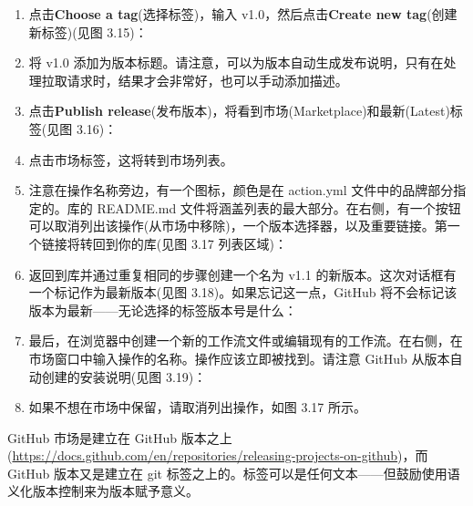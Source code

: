 \begin{enumerate}
\item 
点击\textbf{Choose a tag}(选择标签)，输入 v1.0，然后点击\textbf{Create new tag}(创建新标签)(见图 3.15)：


\item 
将 v1.0 添加为版本标题。请注意，可以为版本自动生成发布说明，只有在处理拉取请求时，结果才会非常好，也可以手动添加描述。

\item 
点击\textbf{Publish release}(发布版本)，将看到市场(Marketplace)和最新(Latest)标签(见图 3.16)：


\item 
点击市场标签，这将转到市场列表。

\item 
注意在操作名称旁边，有一个图标，颜色是在 action.yml 文件中的品牌部分指定的。库的 README.md 文件将涵盖列表的最大部分。在右侧，有一个按钮可以取消列出该操作(从市场中移除)，一个版本选择器，以及重要链接。第一个链接将转回到你的库(见图 3.17 列表区域)：


\item 
返回到库并通过重复相同的步骤创建一个名为 v1.1 的新版本。这次对话框有一个标记作为最新版本(见图 3.18)。如果忘记这一点，GitHub 将不会标记该版本为最新——无论选择的标签版本号是什么：


\item 
最后，在浏览器中创建一个新的工作流文件或编辑现有的工作流。在右侧，在市场窗口中输入操作的名称。操作应该立即被找到。请注意 GitHub 从版本自动创建的安装说明(见图 3.19)：


\item 
如果不想在市场中保留，请取消列出操作，如图 3.17 所示。
\end{enumerate}


GitHub 市场是建立在 GitHub 版本之上(\url{https://docs.github.com/en/repositories/releasing-projects-on-github})，而 GitHub 版本又是建立在 git 标签之上的。标签可以是任何文本——但鼓励使用语义化版本控制来为版本赋予意义。

